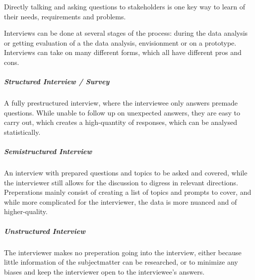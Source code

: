 \begin{method}[Interview] \label{meth:interview} 
  Directly talking and asking questions to stakeholders is one key way to learn
  of their needs, requirements and problems. 
  
  Interviews can be done at several stages of the process: during the data
  analysis or getting evaluation of a the data analysis, envisionment or on a
  prototype. Interviews can take on many different forms, which all have different pros and
  cons.
  \cite[p. 142-146]{benyon_14}
\end{method}

\subparagraph{Structured Interview / Survey} 
A fully prestructured interview, where the interviewee only answers premade
questions. While unable to follow up on unexpected answers, they are easy to
carry out, which creates a high-quantity of responses, which can be analysed
statistically.
\cite[p. 142]{benyon_14}

\subparagraph{Semistructured Interview} 
An interview with prepared questions and topics to be asked and covered, while
the interviewer still allows for the discussion to digress in relevant
directions. Preperations mainly consist of creating a list of topics and prompts
to cover, and while more complicated for the interviewer, the data is more
nuanced and of higher-quality.
\cite[p. 143]{benyon_14}

\subparagraph{Unstructured Interview} 
The interviewer makes no preperation going into the interview, either because
little information of the subjectmatter can be researched, or to minimize any
biases and keep the interviewer open to the interviewee's answers.
\cite[p. 143]{benyon_14}
